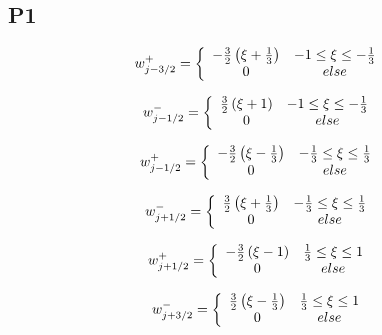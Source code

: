 \documentclass[12pt]{article}
\begin{document}
\subsection{P1}

\[w_{j-3/2}^+ =  \left\lbrace \begin{array}{c c}
-\frac{3}{2}\left(\xi + \frac{1}{3}\right) & -1 \le \xi \le -\frac{1}{3}\\
0 & else
\end{array} \right. \]

\[w_{j-1/2}^- =  \left\lbrace \begin{array}{c c}
\frac{3}{2}\left(\xi + 1\right) & -1 \le \xi \le -\frac{1}{3}\\
0 & else
\end{array} \right. \]

\[w_{j-1/2}^+ =  \left\lbrace \begin{array}{c c}
-\frac{3}{2}\left(\xi -  \frac{1}{3}\right) & -\frac{1}{3} \le \xi \le \frac{1}{3}\\
0 & else
\end{array} \right. \]

\[w_{j+1/2}^- =  \left\lbrace \begin{array}{c c}
\frac{3}{2}\left(\xi +  \frac{1}{3}\right) & -\frac{1}{3} \le \xi \le \frac{1}{3}\\
0 & else
\end{array} \right. \]

\[w_{j+1/2}^+ =  \left\lbrace \begin{array}{c c}
-\frac{3}{2}\left(\xi -1\right) & \frac{1}{3} \le \xi \le 1\\
0 & else
\end{array} \right. \]

\[w_{j+3/2}^- =  \left\lbrace \begin{array}{c c}
\frac{3}{2}\left(\xi -\frac{1}{3}\right) & \frac{1}{3} \le \xi \le 1\\
0 & else
\end{array} \right. \]



  
 
\end{document}
